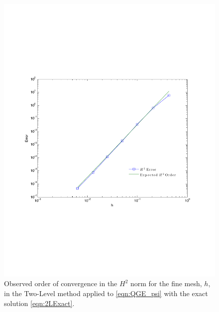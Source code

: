 \begin{figure}
  \begin{center}
    \includegraphics[scale=0.6]{fineConvergence.pdf}
    \caption{Observed order of convergence in the $H^2$ norm for the fine mesh,
      $h$, in the Two-Level method applied to \eqref{eqn:QGE_psi} with the exact
      solution \eqref{eqn:2LExact}.}
  \label{fig:TwoLevelh}
  \end{center}
\end{figure}

